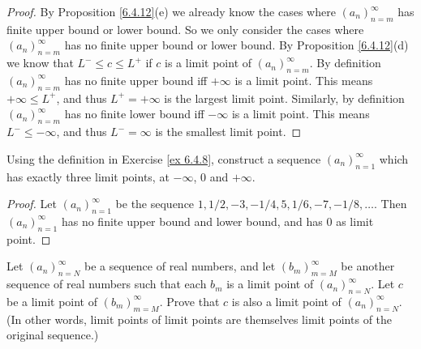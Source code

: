 \begin{proof}
    By Proposition \ref{6.4.12}(e) we already know the cases where \((a_n)_{n = m}^\infty\) has finite upper bound or lower bound.
    So we only consider the cases where \((a_n)_{n = m}^\infty\) has no finite upper bound or lower bound.
    By Proposition \ref{6.4.12}(d) we know that \(L^- \leq c \leq L^+\) if \(c\) is a limit point of \((a_n)_{n = m}^\infty\).
    By definition \((a_n)_{n = m}^\infty\) has no finite upper bound iff \(+\infty\) is a limit point.
    This means \(+\infty \leq L^+\), and thus \(L^+ = +\infty\) is the largest limit point.
    Similarly, by definition \((a_n)_{n = m}^\infty\) has no finite lower bound iff \(-\infty\) is a limit point.
    This means \(L^- \leq -\infty\), and thus \(L^- = \infty\) is the smallest limit point.
\end{proof}

\begin{exercise}\label{ex 6.4.9}
    Using the definition in Exercise \ref{ex 6.4.8}, construct a sequence \((a_n)_{n = 1}^\infty\) which has exactly three limit points, at \(-\infty\), \(0\) and \(+\infty\).
\end{exercise}

\begin{proof}
    Let \((a_n)_{n = 1}^\infty\) be the sequence \(1, 1/2, -3, -1/4, 5, 1/6, -7, -1/8, \dots\).
    Then \((a_n)_{n = 1}^\infty\) has no finite upper bound and lower bound, and has \(0\) as limit point.
\end{proof}

\begin{exercise}\label{ex 6.4.10}
    Let \((a_n)_{n = N}^\infty\) be a sequence of real numbers, and let \((b_m)_{m = M}^\infty\) be another sequence of real numbers such that each \(b_m\) is a limit point of \((a_n)_{n = N}^\infty\).
    Let \(c\) be a limit point of \((b_m)_{m = M}^\infty\).
    Prove that \(c\) is also a limit point of \((a_n)_{n = N}^\infty\).
    (In other words, limit points of limit points are themselves limit points of the original sequence.)
\end{exercise}

